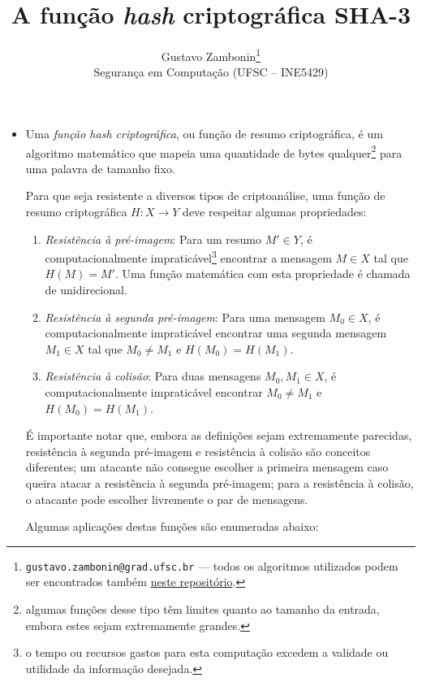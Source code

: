 \documentclass{article}
\title{\textbf{A função \emph{hash} criptográfica SHA-3}}
\author{Gustavo Zambonin\thanks{\texttt{gustavo.zambonin@grad.ufsc.br} ---
todos os algoritmos utilizados podem ser encontrados
também \href{https://github.com/zambonin/ufsc-ine5429}{neste repositório}.} \\
\small {Segurança em Computação (UFSC -- INE5429)} \vspace{-5mm}}
\date{}
\begin{document}
\maketitle

\begin{itemize}

\item Uma \emph{função hash criptográfica}, ou função de resumo criptográfica,
é um algoritmo matemático que mapeia uma quantidade de bytes
qualquer\footnote{algumas funções desse tipo têm limites quanto ao tamanho da
entrada, embora estes sejam extremamente grandes.} para uma palavra de tamanho
fixo.

Para que seja resistente a diversos tipos de criptoanálise, uma função de resumo
criptográfica $H : X \longrightarrow Y$ deve respeitar algumas propriedades:

\begin{enumerate}[label=\roman*.]

\item \emph{Resistência à pré-imagem}: Para um resumo $M' \in Y$, é
computacionalmente impraticável\footnote{o tempo ou recursos gastos para esta
computação excedem a validade ou utilidade da informação desejada.} encontrar a
mensagem $M \in X$ tal que $H(M) = M'$. Uma função matemática com esta
propriedade é chamada de unidirecional.

\item \emph{Resistência à segunda pré-imagem}: Para uma mensagem $M_0 \in X$,
é computacionalmente impraticável encontrar uma segunda mensagem $M_1 \in X$
tal que $M_0 \neq M_1$ e $H(M_0) = H(M_1)$.

\item \emph{Resistência à colisão}: Para duas mensagens $M_0, M_1 \in X$, é
computacionalmente impraticável encontrar $M_0 \neq M_1$ e $H(M_0) = H(M_1)$.

\end{enumerate}

É importante notar que, embora as definições sejam extremamente parecidas,
resistência à segunda pré-imagem e resistência à colisão são conceitos
diferentes; um atacante não consegue escolher a primeira mensagem caso queira
atacar a resistência à segunda pré-imagem; para a resistência à colisão, o
atacante pode escolher livremente o par de mensagens.

Algumas aplicações destas funções são enumeradas abaixo:

\begin{itemize}


\end{itemize}
\end{itemize}
\end{document}

